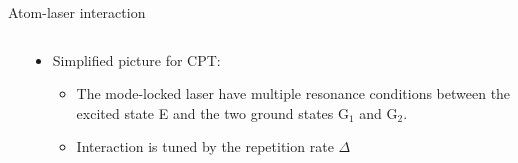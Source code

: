 \begin{block}{Atom-laser interaction}
\begin{columns}
\begin{column}{0.49\textwidth}
\begin{itemize}
      \end{itemize}
    \end{column}
    \begin{column}{0.49\textwidth}
      \begin{itemize}
      \item Simplified picture for CPT:
      \begin{figure}
        \begin{center}
          \setlength\fboxsep{0pt}
          \setlength\fboxrule{0.5pt}
        \end{center}
      \end{figure}
      \begin{itemize}
       \item The mode-locked laser have multiple resonance conditions between the excited state E and the two ground states G$_1$ and G$_2$.
      \item Interaction is tuned by the repetition rate $\Delta$
      \end{itemize}
      \end{itemize}
    \end{column}
  \end{columns}
\end{block}
